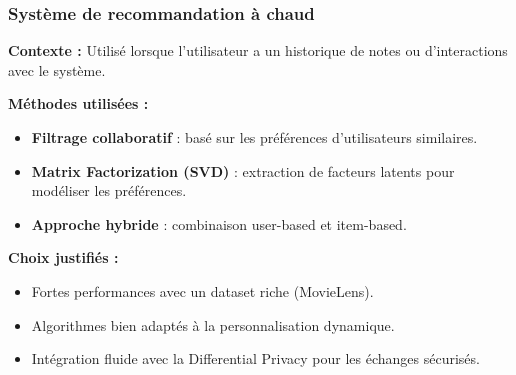 \documentclass{beamer}
\begin{document}
    \begin{frame}
        \scriptsize
        \frametitle{Système de recommandation à chaud}
        \textbf{Contexte :} Utilisé lorsque l’utilisateur a un historique de notes ou d’interactions avec le système.

        \vspace{0.3cm}
        \textbf{Méthodes utilisées :}
        \begin{itemize}
            \item \textbf{Filtrage collaboratif} : basé sur les préférences d’utilisateurs similaires.
            \item \textbf{Matrix Factorization (SVD)} : extraction de facteurs latents pour modéliser les préférences.
            \item \textbf{Approche hybride} : combinaison user-based et item-based.
        \end{itemize}

        \vspace{0.3cm}
        \textbf{Choix justifiés :}
        \begin{itemize}
            \item Fortes performances avec un dataset riche (MovieLens).
            \item Algorithmes bien adaptés à la personnalisation dynamique.
            \item Intégration fluide avec la Differential Privacy pour les échanges sécurisés.
        \end{itemize}
    \end{frame}
\end{document}
